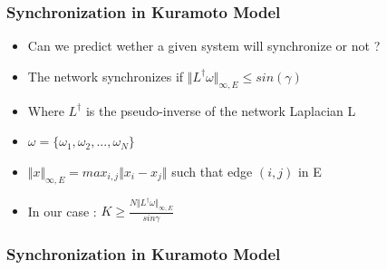 \documentclass[xcolor=dvipsnames]{beamer}
\begin{document}
\begin{frame}
	\frametitle{Synchronization in Kuramoto Model}
	
	\begin{itemize}
		\item Can we predict wether a given system will synchronize or not ?
		\item The network synchronizes if $ \Vert L^{\dagger} \omega \Vert_{\infty,E} \leq sin(\gamma) $ 
		\item Where $L^{\dagger}$ is the pseudo-inverse of the network Laplacian L
		\item $ \omega = \{ \omega_1, \omega_2,..., \omega_N \}$
		\item $ \Vert x \Vert_{\infty,E} = max_{i,j} \Vert x_i - x_j \Vert $ such that edge $(i,j)$ in E
		\item In our case : $ K \geq \frac{N \Vert L^{\dagger} \omega \Vert_{\infty,E}}{sin \gamma} $
	\end{itemize}
\end{frame}

\begin{frame}
	\frametitle{Synchronization in Kuramoto Model}
	
\begin{center}
\end{center}

\end{frame}
\end{document}
